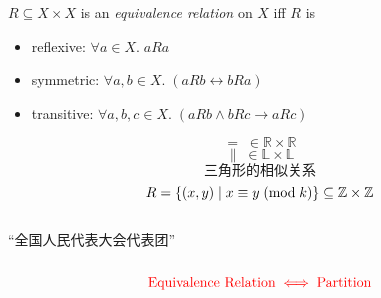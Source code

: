 
\begin{frame}{}
  \begin{center}
  \end{center}
\end{frame}

\begin{frame}{}
  \begin{definition}
    $R \subseteq X \times X$ is an {\it equivalence relation} on $X$ iff $R$ is
    \begin{itemize}
      \item reflexive: $\forall a \in X.\; a R a$
      \item symmetric: $\forall a, b \in X.\; (a R b \leftrightarrow b R a)$
      \item transitive: $\forall a, b, c \in X.\; (a R b \land b R c \to a R c)$
    \end{itemize}
  \end{definition}

  \pause
  \[
    =\; \in \mathbb{R} \times \mathbb{R}
  \]
  \pause
  \[
    \parallel\; \in \mathbb{L} \times \mathbb{L}
  \]
  \pause
  \[
    \text{三角形的相似关系}
  \]
  \pause
  \[
    R = \{(x, y) \mid x \equiv y \;(\text{mod}\; k)\}
      \subseteq \mathbb{Z} \times \mathbb{Z}
  \]

  \pause
  \begin{center}
  \end{center}
\end{frame}

\begin{frame}{}
  \begin{center}
  \end{center}

  \begin{columns}
      \pause
      \pause
      \begin{center}
        ``全国人民代表大会代表团''
      \end{center}
  \end{columns}

  \pause
  \vspace{0.60cm}
  \[
    \textcolor{red}{\text{Equivalence Relation} \iff \text{Partition}}
  \]
\end{frame}

